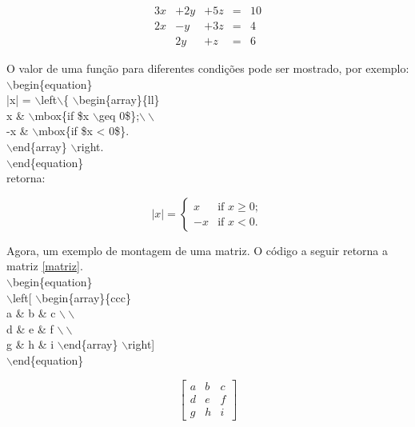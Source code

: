 \begin{equation}
\begin{array}{rrrlr}
3x &+ 2y &+ 5z &= &10\\
2x &- y &+ 3z &= &4\\
&2y &+ z &= &6 
\end{array}
\end{equation}

O valor de uma função para diferentes condições pode ser mostrado, por exemplo:\\

\noindent
$\backslash$begin\{equation\}\\
|x| = $\backslash$left$\backslash$\{ $\backslash$begin\{array\}\{ll\}\\
         x \& $\backslash$mbox\{if \$x $\backslash$geq 0\$\};$\backslash\backslash$\\
        -x \& $\backslash$mbox\{if \$x < 0\$\}.\\
        $\backslash$end\{array\} $\backslash$right.\\
$\backslash$end\{equation\}\\

retorna: 

\begin{equation}
|x| = \left\{ \begin{array}{ll}
         x & \mbox{if $x \geq 0$};\\
        -x & \mbox{if $x < 0$}.
        \end{array} \right. 
\end{equation}

Agora, um exemplo de montagem de uma matriz. O código a seguir retorna a matriz \ref{matriz}.\\

\noindent
$\backslash$begin\{equation\}\\
$\backslash$left[ $\backslash$begin\{array\}\{ccc\}\\
a \& b \& c $\backslash\backslash$\\
d \& e \& f $\backslash\backslash$\\
g \& h \& i $\backslash$end\{array\} $\backslash$right]\\
$\backslash$end\{equation\}

\begin{equation}
\label{matriz}
\left[ \begin{array}{ccc}
a & b & c \\
d & e & f \\
g & h & i \end{array} \right]
\end{equation}

